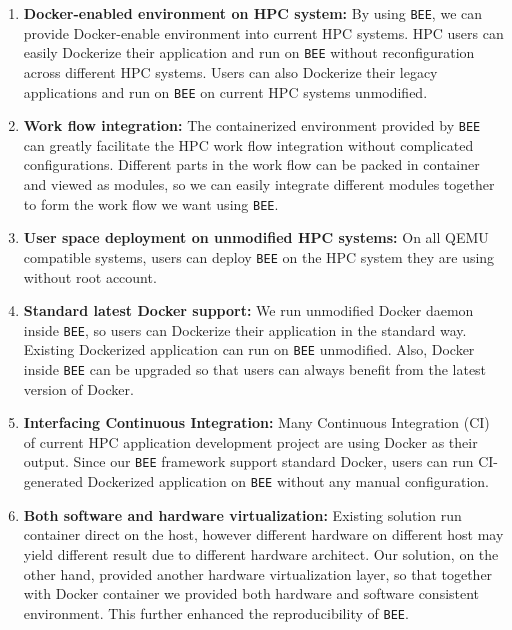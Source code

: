 \begin{enumerate}
\item \textbf{Docker-enabled environment on HPC system:}
By using \texttt{BEE}, we can provide Docker-enable environment into current HPC systems. HPC users can easily Dockerize their application and run on \texttt{BEE} without reconfiguration across different HPC systems. Users can also Dockerize their legacy applications and run on \texttt{BEE} on current HPC systems unmodified.

\item \textbf{Work flow integration:}
The containerized environment provided by \texttt{BEE} can greatly facilitate the HPC work flow integration without complicated configurations. Different parts in the work flow can be packed in container and viewed as modules, so we can easily integrate different modules together to form the work flow we want using \texttt{BEE}.

\item \textbf{User space deployment on unmodified HPC systems:}
On all QEMU compatible systems, users can deploy \texttt{BEE} on the HPC system they are using without root account.

\item \textbf{Standard latest Docker support:}
We run unmodified Docker daemon inside \texttt{BEE}, so users can Dockerize their application in the standard way. Existing Dockerized application can run on \texttt{BEE} unmodified. Also, Docker inside \texttt{BEE} can be upgraded so that users can always benefit from the latest version of Docker.

\item \textbf{Interfacing Continuous Integration:}
Many Continuous Integration (CI) of current HPC application development project are using Docker as their output. Since our \texttt{BEE} framework support standard Docker, users can run CI-generated Dockerized application on \texttt{BEE} without any manual configuration.

\item \textbf{Both software and hardware virtualization:}
Existing solution run container direct on the host, however different hardware on different host may yield different result due to different hardware architect. Our solution, on the other hand, provided another hardware virtualization layer, so that together with Docker container we provided both hardware and software consistent environment. This further enhanced the reproducibility of \texttt{BEE}.



\end{enumerate}
